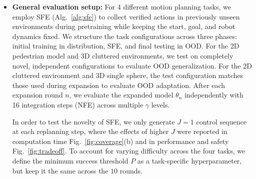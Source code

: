 
\begin{itemize}[leftmargin=0pt, itemindent=0pt, label={}]
    \item \textbf{General evaluation setup:} For 4 different motion planning tasks, we employ SFE (Alg.~\ref{alg:sfe}) to collect verified actions in previously unseen environments during pretraining while keeping the start, goal, and robot dynamics fixed. We structure the task configurations across three phases: initial training in distribution, SFE, and final testing in OOD. For the 2D pedestrian model and 3D cluttered environments, we test on completely novel, independent configurations to evaluate OOD generalization. For the 2D cluttered environment and 3D single sphere, the test configuration matches those used during expansion to evaluate OOD adaptation. After each expansion round $n$, we evaluate the expanded model $\theta_n$ independently with 16 integration steps (NFE) across multiple $\gamma$ levels. 
    
    In order to test the novelty of SFE, we only generate $J=1$ control sequence at each replanning step, where the effects of higher $J$ were reported in computation time Fig.~\ref{fig:coverage}(b) and in performance and safety Fig.~\ref{fig:tradeoff}. 
    To account for varying difficulty across the four tasks, we define the minimum success threshold $P$ as a task-specific hyperparameter, but keep it the same across the $10$ rounds. 
    

\end{itemize}
